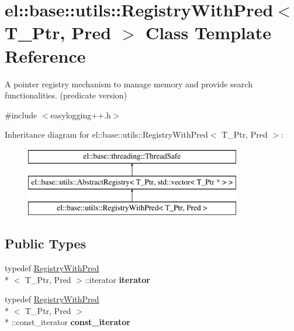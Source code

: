 \hypertarget{classel_1_1base_1_1utils_1_1RegistryWithPred}{\section{el\-:\-:base\-:\-:utils\-:\-:Registry\-With\-Pred$<$ T\-\_\-\-Ptr, Pred $>$ Class Template Reference}
\label{classel_1_1base_1_1utils_1_1RegistryWithPred}
}


A pointer registry mechanism to manage memory and provide search functionalities. (predicate version)  




{\ttfamily \#include $<$easylogging++.\-h$>$}

Inheritance diagram for el\-:\-:base\-:\-:utils\-:\-:Registry\-With\-Pred$<$ T\-\_\-\-Ptr, Pred $>$\-:\begin{figure}[H]
\begin{center}
\leavevmode
\includegraphics[height=3.000000cm]{classel_1_1base_1_1utils_1_1RegistryWithPred}
\end{center}
\end{figure}
\subsection*{Public Types}
\begin{DoxyCompactItemize}
\item 
\hypertarget{classel_1_1base_1_1utils_1_1RegistryWithPred_afc03d2d0a72f5ebf03e1e3b37bd9932d}{typedef \hyperlink{classel_1_1base_1_1utils_1_1RegistryWithPred}{Registry\-With\-Pred}\\*
$<$ T\-\_\-\-Ptr, Pred $>$\-::iterator {\bfseries iterator}}\label{classel_1_1base_1_1utils_1_1RegistryWithPred_afc03d2d0a72f5ebf03e1e3b37bd9932d}

\item 
\hypertarget{classel_1_1base_1_1utils_1_1RegistryWithPred_ad9af7a8eeedd58a75eb70bccb334f6dc}{typedef \hyperlink{classel_1_1base_1_1utils_1_1RegistryWithPred}{Registry\-With\-Pred}\\*
$<$ T\-\_\-\-Ptr, Pred $>$\\*
\-::const\-\_\-iterator {\bfseries const\-\_\-iterator}}\label{classel_1_1base_1_1utils_1_1RegistryWithPred_ad9af7a8eeedd58a75eb70bccb334f6dc}

\end{DoxyCompactItemize}
